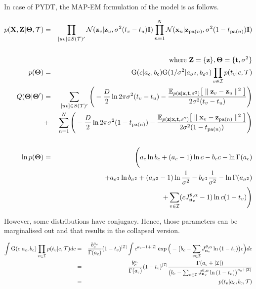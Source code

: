 \documentclass{article}
\begin{document}
	In case of PYDT, the MAP-EM formulation of the model is as follows.
	
	\begin{eqnarray}
		p(\bold{X}, \bold{Z} | \boldsymbol{\Theta}, \mathcal{T}) &=& 
		\prod_{[uv] \in S(\mathcal{T})'} \mathcal{N}(\bold{z}_v|\bold{z}_u, \sigma^2(t_v - t_u)\bold{I}) \prod^N_{n=1} \mathcal{N}(\bold{x}_n|\bold{z}_{\textrm{pa}(n)}, \sigma^2(1 - t_{\textrm{pa}(n)})\bold{I}) \nonumber \\
		& & \\
		& & \textrm{where } \bold{Z} = \{\bold{z} \}, \boldsymbol{\Theta} = \{\bold{t}, \sigma^2\} \nonumber \\
		p(\boldsymbol{\Theta}) &=& \textrm{G}(c | a_c, b_c) \textrm{G}(1/\sigma^2 | a_{\sigma^2}, b_{\sigma^2}) \prod_{v \in \mathcal{I}} p(t_v | c, \mathcal{T}) \\
		Q(\boldsymbol{\Theta} | \boldsymbol{\Theta}') &=& \sum_{[uv] \in S(\mathcal{T})'} \Bigg(-\frac{D}{2}\ln2\pi\sigma^2(t_v - t_u) - \frac{ \mathbb{E}_{p(\bold{z}|\bold{x}, \bold{t}, \sigma^2)} \big[\parallel \bold{z}_v - \bold{z}_u \parallel^2 \big]}{2\sigma^2(t_v - t_u)} \Bigg) \nonumber \\
	 	&+& \sum^N_{n=1} \Bigg(-\frac{D}{2}\ln2\pi\sigma^2(1 - t_{\textrm{pa}(n)}) - \frac{\mathbb{E}_{p(\bold{z}|\bold{x}, \bold{t}, \sigma^2)} \big[ \parallel \bold{x}_v - \bold{z}_{\textrm{pa}(n)} \parallel^2 \big]}{2\sigma^2(1 - t_{\textrm{pa}(n)})} \Bigg) \nonumber \\
	 	& & \\
	 	\ln p(\boldsymbol{\Theta}) &=& \Bigg(a_c \ln{b_c} + (a_c - 1)\ln{c} - b_cc - \ln{\Gamma(a_c)} \nonumber \\
	 	& & + a_{\sigma^2} \ln{b_{\sigma^2}} + (a_{\sigma^2} - 1)\ln{\frac{1}{\sigma^2}} - b_{\sigma^2}\frac{1}{\sigma^2} - \ln{\Gamma(a_{\sigma^2})} \nonumber \\
	 	& & + \sum_{v \in \mathcal{I}} (cJ^{\theta, \alpha}_{\bold{n}_v} - 1) \ln{c(1 - t_v)} \Bigg)
	\end{eqnarray}
	
	However, some distributions have conjugacy. Hence, those parameters can be marginalised out and that results in the collapsed version.
	
	\begin{eqnarray}
		\int \textrm{G}(c | a_c, b_c) \prod_{v \in \mathcal{I}} p(t_v | c, \mathcal{T}) dc &=& \frac{b^{a_c}_c}{\Gamma(a_c)}(1 - t_v)^{|\mathcal{I}|} \int c^{a_c - 1 + |\mathcal{I}|} \exp \Big( - \big( b_c - \sum_{v \in \mathcal{I}} J^{\theta, \alpha}_{\bold{n}_v} \ln{(1 - t_v)} \big) c \Big) dc \nonumber \\
		&=& \frac{b^{a_c}_c}{\Gamma(a_c)}(1 - t_v)^{|\mathcal{I}|} \frac{\Gamma(a_c + |\mathcal{I}|)}{\big( b_c - \sum_{v \in \mathcal{I}} J^{\theta, \alpha}_{\bold{n}_v} \ln{(1 - t_v)} \big)^{a_c + |\mathcal{I}|}} \nonumber \\
		&=& p(t_v | a_c, b_c, \mathcal{T})
	\end{eqnarray}
\end{document}
